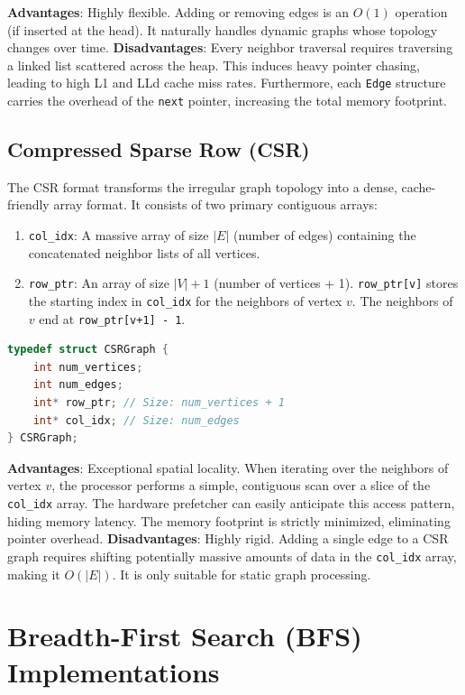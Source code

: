 \documentclass[11pt]{article}
\begin{document}
\textbf{Advantages}: Highly flexible. Adding or removing edges is an $O(1)$ operation (if inserted at the head). It naturally handles dynamic graphs whose topology changes over time.
\textbf{Disadvantages}: Every neighbor traversal requires traversing a linked list scattered across the heap. This induces heavy pointer chasing, leading to high L1 and LLd cache miss rates. Furthermore, each \texttt{Edge} structure carries the overhead of the \texttt{next} pointer, increasing the total memory footprint.

\subsection{Compressed Sparse Row (CSR)}

The CSR format transforms the irregular graph topology into a dense, cache-friendly array format. It consists of two primary contiguous arrays:
\begin{enumerate}
    \item \texttt{col\_idx}: A massive array of size $|E|$ (number of edges) containing the concatenated neighbor lists of all vertices.
    \item \texttt{row\_ptr}: An array of size $|V| + 1$ (number of vertices + 1). \texttt{row\_ptr[v]} stores the starting index in \texttt{col\_idx} for the neighbors of vertex $v$. The neighbors of $v$ end at \texttt{row\_ptr[v+1] - 1}.
\end{enumerate}

\begin{lstlisting}[language=C, caption=CSR Graph Structure]
typedef struct CSRGraph {
    int num_vertices;
    int num_edges;
    int* row_ptr; // Size: num_vertices + 1
    int* col_idx; // Size: num_edges
} CSRGraph;
\end{lstlisting}

\textbf{Advantages}: Exceptional spatial locality. When iterating over the neighbors of vertex $v$, the processor performs a simple, contiguous scan over a slice of the \texttt{col\_idx} array. The hardware prefetcher can easily anticipate this access pattern, hiding memory latency. The memory footprint is strictly minimized, eliminating pointer overhead.
\textbf{Disadvantages}: Highly rigid. Adding a single edge to a CSR graph requires shifting potentially massive amounts of data in the \texttt{col\_idx} array, making it $O(|E|)$. It is only suitable for static graph processing.

\section{Breadth-First Search (BFS) Implementations}
\end{document}
